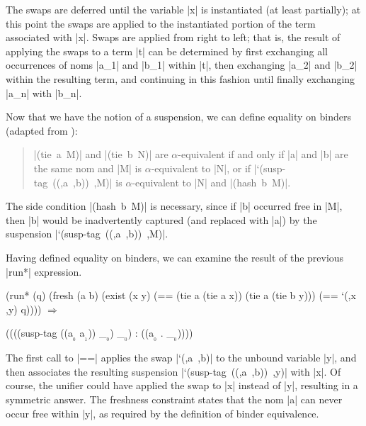\noindent The swaps are deferred until the variable \scheme|x| is
instantiated (at least partially); at this point the swaps are applied
to the instantiated portion of the term associated with \scheme|x|.
Swaps are applied from right to left; that is, the result of applying
the swaps to a term \scheme|t| can be determined by first exchanging
all occurrences of noms \scheme|a_1| and \scheme|b_1| within
\scheme|t|, then exchanging \scheme|a_2| and \scheme|b_2| within the
resulting term, and continuing in this fashion until finally
exchanging \scheme|a_n| with \scheme|b_n|.

Now that we have the notion of a suspension, we can define equality on
binders (adapted from \citealt{Urban-Pitts-Gabbay/04}):

\begin{quotation}
\noindent \mbox{\scheme|(tie a M)|} and \mbox{\scheme|(tie b N)|} are $\alpha$-equivalent if and only if
 \scheme|a| and \scheme|b| are the same nom and \scheme|M| is $\alpha$-equivalent to \scheme|N|, or if 
 \mbox{\scheme|`(susp-tag ((,a ,b)) ,M)|} is $\alpha$-equivalent to \scheme|N| and \mbox{\scheme|(hash b M)|}.
\end{quotation}

\noindent The side condition \mbox{\scheme|(hash b M)|} is necessary,
since if \scheme|b| occurred free in \scheme|M|, then \scheme|b| would be inadvertently 
captured (and replaced with \scheme|a|) by the suspension \mbox{\scheme|`(susp-tag ((,a ,b)) ,M)|}.


Having defined equality on binders, 
we can examine the result of the previous \scheme|run*| expression.

\schemedisplayspace
\begin{schemedisplay}
(run* (q)
  (fresh (a b)
    (exist (x y)
      (== (tie a (tie a x)) (tie a (tie b y)))
      (== `(,x ,y) q)))) $\Rightarrow$ 
\end{schemedisplay}
\nspace
\begin{schemeresponse}((((susp-tag ((a$_{_{0}}$ a$_{_{1}}$)) _$_{_{0}}$) _$_{_{0}}$) : ((a$_{_{0}}$ . _$_{_{0}}$))))\end{schemeresponse}

\noindent The first call to \scheme|==| 
applies the swap \mbox{\scheme|`(,a ,b)|}
to the unbound variable \scheme|y|, and then
associates 
the resulting suspension \mbox{\scheme|`(susp-tag ((,a ,b)) ,y)|}
with \scheme|x|.  
Of course, the unifier
could have applied the swap to \scheme|x| instead of \scheme|y|,
resulting in a symmetric answer.
The freshness constraint states that the nom \scheme|a| can never
occur free within \scheme|y|, as required by the definition of 
binder equivalence.

